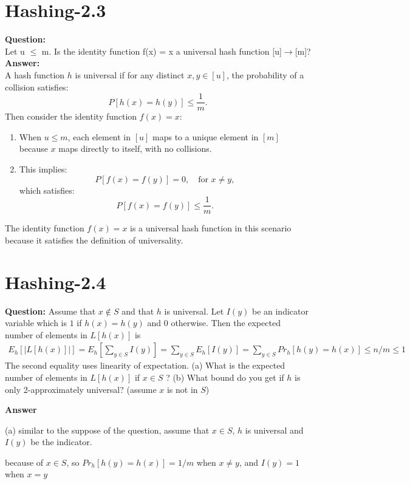 \documentclass[12pt]{article}
\begin{document}
\section{Hashing-2.3}
\textbf{Question:}\\
Let u $\leq$ m. Is the identity function f(x) = x a universal hash function [u]$\rightarrow$[m]?\\
\textbf{Answer:}\\
A hash function \( h \) is universal if for any distinct \( x, y \in [u] \), the probability of a collision satisfies:
\[
P[h(x) = h(y)] \leq \frac{1}{m}.
\]
Then consider the identity function \( f(x) = x \):
\begin{enumerate}
    \item When \( u \leq m \), each element in \( [u] \) maps to a unique element in \( [m] \) because \( x \) maps directly to itself, with no collisions.
    \item This implies:
    \[
    P[f(x) = f(y)] = 0, \quad \text{for } x \neq y,
    \]
    which satisfies:
    \[
    P[f(x) = f(y)] \leq \frac{1}{m}.
    \]
\end{enumerate}
The identity function \( f(x) = x \) is a universal hash function in this scenario because it satisfies the definition of universality.

\section{Hashing-2.4}
\textbf{Question:} 
Assume that $x \notin S$ and that $h$ is universal. Let $I(y)$ be an indicator variable which is $1$ if $h(x) = h(y)$ and $0$ otherwise. Then the expected number of elements in $L[h(x)]$ is
\begin{align}
    E_h[|L[h(x)]|] = E_h [\sum_{y\in S} I(y)]  = \sum_{y \in S} E_h[I(y)] = \sum_{y \in S} Pr_h[h(y) = h(x)] \leq n/m \leq 1
\end{align}
 The second equality uses linearity of expectation.
(a) What is the expected number of elements in $L[h(x)]$ if $x \in S$ ?
(b) What bound do you get if $h$ is only 2-approximately universal? (assume $x$ is not in $S$)

\textbf{Answer}

(a) similar to the suppose of the question, assume that $x \in S$, $h$ is universal and $I(y)$ be the indicator.

because of $x \in S$, so $Pr_h[h(y) = h(x)] = 1/m$ when $x \neq y$, and $I(y)= 1$ when $x = y$\\
\end{document}
